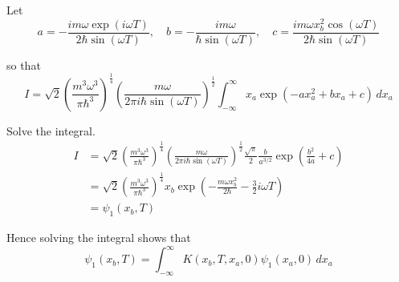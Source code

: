 Let
\begin{equation*}
a=-\frac{im\omega\exp(i\omega T)}{2\hbar\sin(\omega T)},\quad
b=-\frac{im\omega}{\hbar\sin(\omega T)},\quad
c=\frac{im\omega x_b^2\cos(\omega T)}{2\hbar\sin(\omega T)}
\end{equation*}

so that
\begin{equation*}
I=\sqrt2\left(\frac{m^3\omega^3}{\pi\hbar^3}\right)^\frac{1}{4}
\left(\frac{m\omega}{2\pi i\hbar\sin(\omega T)}\right)^\frac{1}{2}
\int_{-\infty}^\infty
x_a\exp(-ax_a^2+bx_a+c)\,dx_a
\end{equation*}

Solve the integral.
\begin{align*}
I&=\sqrt2\left(\frac{m^3\omega^3}{\pi\hbar^3}\right)^\frac{1}{4}
\left(\frac{m\omega}{2\pi i\hbar\sin(\omega T)}\right)^\frac{1}{2}
\frac{\sqrt\pi}{2}\frac{b}{a^{3/2}}\exp\left(\frac{b^2}{4a}+c\right)
\\
&=\sqrt2\left(\frac{m^3\omega^3}{\pi\hbar^3}\right)^\frac{1}{4}
x_b\exp\left(-\frac{m\omega x_b^2}{2\hbar}-\tfrac{3}{2}i\omega T\right)
\\
&=\psi_1(x_b,T)
\end{align*}

Hence solving the integral shows that
\begin{equation*}
\psi_1(x_b,T)=\int_{-\infty}^\infty K(x_b,T,x_a,0)\psi_1(x_a,0)\,dx_a
\end{equation*}


